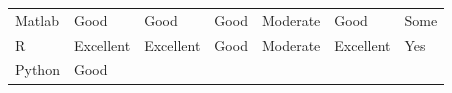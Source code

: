 \documentclass[
]{book}
\begin{document}
\begin{longtable}[]{@{}lllllll@{}}
\begin{minipage}[t]{0.08\columnwidth}\raggedright
Matlab\strut
\end{minipage} & \begin{minipage}[t]{0.10\columnwidth}\raggedright
Good\strut
\end{minipage} & \begin{minipage}[t]{0.13\columnwidth}\raggedright
Good\strut
\end{minipage} & \begin{minipage}[t]{0.16\columnwidth}\raggedright
Good\strut
\end{minipage} & \begin{minipage}[t]{0.11\columnwidth}\raggedright
Moderate\strut
\end{minipage} & \begin{minipage}[t]{0.17\columnwidth}\raggedright
Good\strut
\end{minipage} & \begin{minipage}[t]{0.05\columnwidth}\raggedright
Some\strut
\end{minipage}\tabularnewline
\begin{minipage}[t]{0.08\columnwidth}\raggedright
R\strut
\end{minipage} & \begin{minipage}[t]{0.10\columnwidth}\raggedright
Excellent\strut
\end{minipage} & \begin{minipage}[t]{0.13\columnwidth}\raggedright
Excellent\strut
\end{minipage} & \begin{minipage}[t]{0.16\columnwidth}\raggedright
Good\strut
\end{minipage} & \begin{minipage}[t]{0.11\columnwidth}\raggedright
Moderate\strut
\end{minipage} & \begin{minipage}[t]{0.17\columnwidth}\raggedright
Excellent\strut
\end{minipage} & \begin{minipage}[t]{0.05\columnwidth}\raggedright
Yes\strut
\end{minipage}\tabularnewline
\begin{minipage}[t]{0.08\columnwidth}\raggedright
Python\strut
\end{minipage} & \begin{minipage}[t]{0.10\columnwidth}\raggedright
Good\strut
\end{minipage} & \begin{minipage}[t]{0.13\columnwidth}\raggedright

\end{minipage}
\end{longtable}
\end{document}
